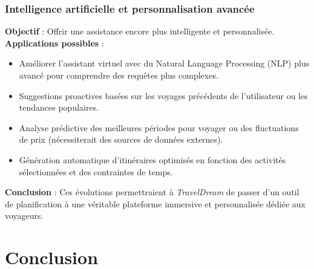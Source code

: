 \documentclass[a4paper,12pt]{article}
\begin{document}
\subsubsection{Intelligence artificielle et personnalisation avancée}
\textbf{Objectif} : Offrir une assistance encore plus intelligente et personnalisée. \\
\textbf{Applications possibles} :
\begin{itemize}
  \item Améliorer l'assistant virtuel avec du Natural Language Processing (NLP) plus avancé pour comprendre des requêtes plus complexes.
  \item Suggestions proactives basées sur les voyages précédents de l'utilisateur ou les tendances populaires.
  \item Analyse prédictive des meilleures périodes pour voyager ou des fluctuations de prix (nécessiterait des sources de données externes).
  \item Génération automatique d'itinéraires optimisés en fonction des activités sélectionnées et des contraintes de temps.
\end{itemize}


\textbf{Conclusion} : Ces évolutions permettraient à \textit{TravelDream} de passer d’un outil de planification à une véritable plateforme immersive et personnalisée dédiée aux voyageurs.
\section{Conclusion}
\end{document}
